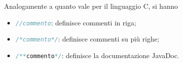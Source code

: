 \documentclass{subfiles}
\begin{document}
Analogamente a quanto vale per il linguaggio C, si hanno
\begin{itemize}
    \item \lstinline[language = Java]{//commento}: definisce commenti in riga;
    \item \lstinline[language = Java]{/*commento*/}: definisce commenti su più righe;
    \item \lstinline[language = Java]{/**commento*/}: definisce la documentazione JavaDoc\footnotemark[1].
\end{itemize}

\end{document}
